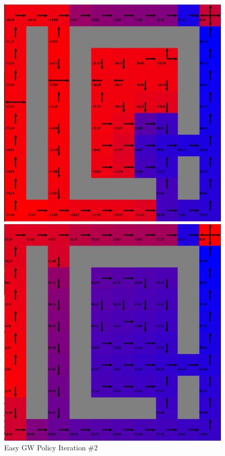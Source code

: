 \documentclass[h]{article}
\begin{document}
 
    \begin{figure}[H]
      \includegraphics[width=1\textwidth,keepaspectratio]{easy-policy-2.png} 
      \caption*{Easy GW Policy Iteration \#2} 
   \endminipage\hfill
      \includegraphics[width=1\textwidth,keepaspectratio]{easy-policy-5.png} 

\end{figure}
\end{document}
